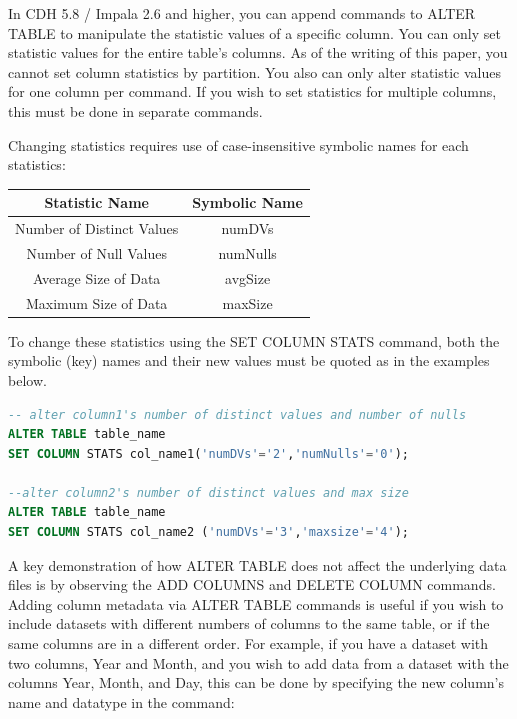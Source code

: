 \documentclass[onecolumn, draftclsnofoot,10pt, compsoc]{IEEEtran}
\begin{document}
In CDH 5.8 / Impala 2.6 and higher, you can append commands to ALTER TABLE to manipulate the statistic values of a specific column.
You can only set statistic values for the entire table’s columns.
As of the writing of this paper, you cannot set column statistics by partition.
You also can only alter statistic values for one column per command.
If you wish to set statistics for multiple columns, this must be done in separate commands.

Changing statistics requires use of case-insensitive symbolic names for each statistics:
\begin{center}
\begin{tabular}{ |c|c| }
    \hline
    Statistic Name & Symbolic Name \\
    \hline
    Number of Distinct Values  & numDVs \\
    Number of Null Values & numNulls \\
    Average Size of Data & avgSize \\
    Maximum Size of Data & maxSize \\
    \hline
\end{tabular}
\end{center}

To change these statistics using the SET COLUMN STATS command, both the symbolic (key) names and their new values must be quoted as in the examples below.

    \begin{center}
    \begin{lstlisting}[language=SQL]
-- alter column1's number of distinct values and number of nulls
ALTER TABLE table_name 
SET COLUMN STATS col_name1('numDVs'='2','numNulls'='0'); 

--alter column2's number of distinct values and max size 
ALTER TABLE table_name 
SET COLUMN STATS col_name2 ('numDVs'='3','maxsize'='4');
\end{lstlisting}
\end{center}

A key demonstration of how ALTER TABLE does not affect the underlying data files is by observing the ADD COLUMNS and DELETE COLUMN commands.
Adding column metadata via ALTER TABLE commands is useful if you wish to include datasets with different numbers of columns to the same table, or if the same columns are in a different order.
For example, if you have a dataset with two columns, Year and Month, and you wish to add data from a dataset with the columns Year, Month, and Day, this can be done by specifying the new column’s name and datatype in the command:
\end{document}
